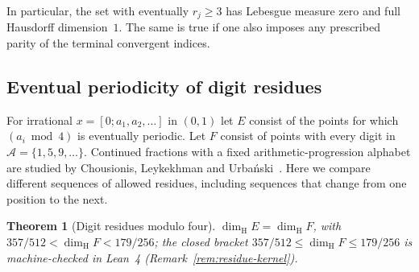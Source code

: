 \documentclass[11pt]{article}
\newtheorem{theorem}{Theorem}
\theoremstyle{definition}
\theoremstyle{remark}
\newcommand{\dimH}{\dim_{\mathrm{H}}}
\begin{document}
In particular, the set with eventually $r_j\ge3$ has Lebesgue
measure zero and full Hausdorff dimension~$1$. The same is true if one
also imposes any prescribed parity of the terminal convergent
indices.

\subsection{Eventual periodicity of digit residues}

For irrational $x=[0;a_1,a_2,\ldots]$ in $(0,1)$ let $E$ consist of
the points for which $(a_i\bmod4)$ is eventually periodic. Let $F$
consist of points with every digit in $\mathcal A=\{1,5,9,\ldots\}$.
Continued fractions with a fixed arithmetic-progression alphabet are
studied by Chousionis, Leykekhman and Urba\'nski~\cite{CLU}. Here
we compare different sequences of allowed residues, including sequences
that change from one position to the next.

\begin{theorem}[Digit residues modulo four]\label{thm:residues}
$\dimH E=\dimH F$, with $357/512<\dimH F<179/256$; the closed bracket
$357/512\le\dimH F\le179/256$ is machine-checked in Lean~4 (Remark~\ref{rem:residue-kernel}).
\end{theorem}
\end{document}
